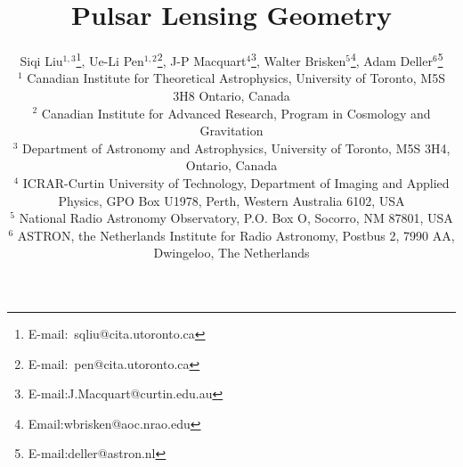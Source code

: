 \documentclass[useAMS,usenatbib]{mn2e}
\begin{document}
\title[Lensing Distance]{
Pulsar Lensing Geometry
}


\author[Liu et al]{Siqi Liu$^{1,3}$\thanks{E-mail:\ sqliu@cita.utoronto.ca}, Ue-Li
  Pen$^{1,2}$\thanks{E-mail:\ pen@cita.utoronto.ca}, J-P Macquart$^{4}$\thanks{E-mail:J.Macquart@curtin.edu.au},
  Walter Brisken$^{5}$\thanks{Email:wbrisken@aoc.nrao.edu}, Adam Deller$^{6}$\thanks{E-mail:deller@astron.nl}\\
 $^1$ Canadian Institute for Theoretical Astrophysics, University of Toronto, M5S 3H8 Ontario, Canada \\
$^2$ Canadian Institute for Advanced Research, Program in Cosmology
and Gravitation\\
$^3$ Department of Astronomy and Astrophysics, University of Toronto, M5S 3H4, Ontario, Canada\\
$^4$ ICRAR-Curtin University of Technology, Department of Imaging and Applied Physics, GPO Box U1978, Perth, Western Australia 6102, USA \\
$^5$ National Radio Astronomy Observatory, P.O. Box O, Socorro, NM 87801, USA\\
$^6$ ASTRON, the Netherlands Institute for Radio Astronomy, Postbus 2, 7990 AA, Dwingeloo, The Netherlands\\
}
\end{document}
